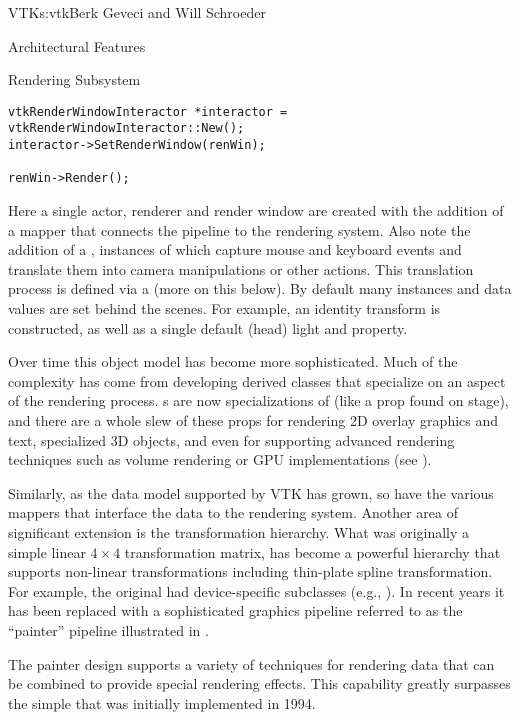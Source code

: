 \begin{aosachapter}{VTK}{s:vtk}{Berk Geveci and Will Schroeder}
\begin{aosasect1}{Architectural Features}
\begin{aosasect2}{Rendering Subsystem}
\begin{verbatim}
vtkRenderWindowInteractor *interactor = vtkRenderWindowInteractor::New();
interactor->SetRenderWindow(renWin);

renWin->Render();
\end{verbatim}

Here a single actor, renderer and render window are created with the
addition of a mapper that connects the pipeline to the rendering
system. Also note the addition of a ,
instances of which capture mouse and keyboard events and translate
them into camera manipulations or other actions. This translation
process is defined via a  (more on this
below). By default many instances and data values are set behind the
scenes. For example, an identity transform is constructed, as well as a
single default (head) light and property.

Over time this object model has become more sophisticated. Much of the
complexity has come from developing derived classes that specialize on
an aspect of the rendering process. s are now
specializations of  (like a prop found on stage), and
there are a whole slew of these props for rendering 2D overlay
graphics and text, specialized 3D objects, and even for supporting
advanced rendering techniques such as volume rendering or GPU
implementations (see ).

Similarly, as the data model supported by VTK has grown, so have the
various mappers that interface the data to the rendering
system. Another area of significant extension is the transformation
hierarchy. What was originally a simple linear $4{\times}4$
transformation matrix, has become a powerful hierarchy that supports
non-linear transformations including thin-plate spline
transformation. For example, the original  had
device-specific subclasses (e.g., ). In
recent years it has been replaced with a sophisticated graphics
pipeline referred to as the ``painter'' pipeline illustrated in
.


The painter design supports a variety of techniques for rendering data
that can be combined to provide special rendering effects. This
capability greatly surpasses the simple  that
was initially implemented in 1994.


\end{aosasect2}
\end{aosasect1}
\end{aosachapter}
